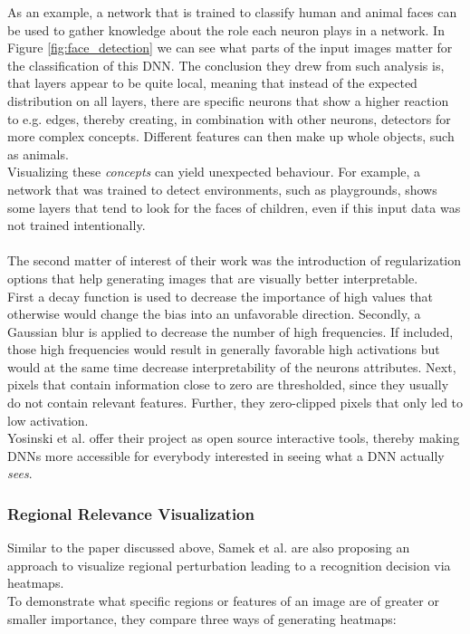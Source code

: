 \documentclass{acmsiggraph}               %
\begin{document}
As an example, a network that is trained to classify human and animal faces can be used to gather knowledge about the role each neuron plays in a network. In Figure \ref{fig:face_detection} we can see what parts of the input images matter for the classification of this DNN. The conclusion they drew from such analysis is, that layers appear to be quite local, meaning that instead of the expected distribution on all layers, there are specific neurons that show a higher reaction to e.g. edges, thereby creating, in combination with other neurons, detectors for more complex concepts. Different features can then make up whole objects, such as animals. \\Visualizing these \textit{concepts} can yield unexpected behaviour. For example, a network that was trained to detect environments, such as playgrounds, shows some layers that tend to look for the faces of children, even if this input data was not trained intentionally.\\\\
The second matter of interest of their work was the introduction of regularization options that help  generating images that are visually better interpretable.\\
First a decay function is used to decrease the importance of high values that otherwise would change the bias into an unfavorable direction. Secondly, a Gaussian blur is applied to decrease the number of high frequencies. If included, those high frequencies would result in generally favorable high activations but would at the same time decrease interpretability of the neurons attributes. Next, pixels that contain information close to zero are thresholded, since they usually do not contain relevant features. Further, they zero-clipped pixels that only led to low activation.\\
Yosinski et al. offer their project as open source interactive tools, thereby making DNNs more accessible for everybody interested in seeing what a DNN actually \textit{sees}.

\subsubsection{Regional Relevance Visualization}
Similar to the paper discussed above, Samek et al. are also proposing an approach to visualize regional perturbation leading to a recognition decision via heatmaps. \cite{Samek2017} \\
To demonstrate what specific regions or features of an image are of greater or smaller importance, they compare three ways of generating heatmaps:
\end{document}
